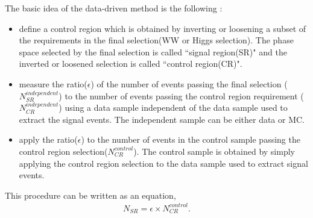 The basic idea of the data-driven method is the following : 
\begin{itemize}
\item define a control region which is obtained by inverting or loosening 
      a subset of the requirements in the final selection(WW or Higgs selection).
      The phase space selected by the final selection is called ``signal region(SR)" 
      and the inverted or loosened selection is called ``control region(CR)". 
\item measure the ratio($\epsilon$) of the number of events passing the 
      final selection ($N_{SR}^{independent}$) to the number of events 
      passing the control region requirement ($N_{CR}^{independent}$) 
      using a data sample independent of the data sample 
      used to extract the signal events. 
      The independent sample can be either data or MC. 
\item apply the ratio($\epsilon$) to the number of events in the control sample 
      passing the control region selection($N_{CR}^{control}$). The control sample 
      is obtained by simply applying the control region selection 
      to the data sample used to extract signal events. 
\end{itemize}
This procedure can be written as an equation, 
\begin{eqnarray} 
N_{SR} = \epsilon \times N_{CR}^{control}.
\end{eqnarray} 

